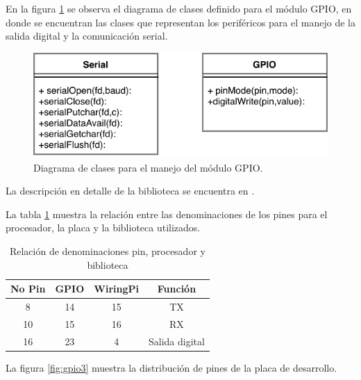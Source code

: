 En la figura \ref{fig:clasesgpio} se observa el diagrama de clases definido para el módulo GPIO, en donde se encuentran las clases que representan los periféricos para el manejo de la salida digital y la comunicación serial.

\begin{figure}[H]
	\centering
	\includegraphics[scale=1]{./Figures/clasesgpio.pdf}
	\caption{Diagrama de clases para el manejo del módulo GPIO.}
	\label{fig:clasesgpio}
\end{figure}

La descripción en detalle de la biblioteca se encuentra en \citep{WIRINGPI}.


La tabla \ref{tab:pines} muestra la relación entre las denominaciones de los pines para el procesador, la placa y la biblioteca utilizados.

\begin{table}[h]
	\centering
	\caption[Denominación de pines]{Relación de denominaciones pin, procesador y biblioteca}
	\begin{tabular}{c c c c}    
		\toprule
		\textbf{No Pin}  & \textbf{GPIO}  & \textbf{WiringPi} & \textbf{Función}\\
		\midrule
		8		& 14		& 15	& TX\\		
		10		& 15		& 16	& RX\\
		16		& 23		& 4		& Salida digital\\					
		\bottomrule
		\hline
	\end{tabular}
	\label{tab:pines}
\end{table}

La figura \ref{fig:gpio3}  muestra la distribución de pines de la placa de desarrollo.

